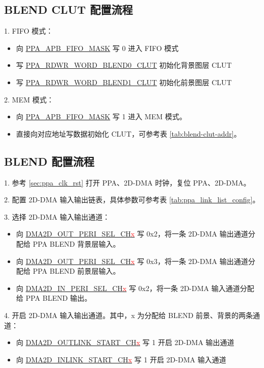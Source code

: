 \documentclass[main\_\_CN.tex]{subfiles}
\begin{document}
\subsection{BLEND CLUT 配置流程}
\label{sec: ppa_blend_clut_config}
1. FIFO 模式：

\begin{itemize}
    \item 向 \hyperref[fielddesc:PPAAPBFIFOMASK]{PPA\_APB\_FIFO\_MASK} 写 0 进入 FIFO 模式
    \item 写 \hyperref[fielddesc:PPARDWRWORDBLEND0CLUT]{PPA\_RDWR\_WORD\_BLEND0\_CLUT} 初始化背景图层 CLUT
    \item 写 \hyperref[fielddesc:PPARDWRWORDBLEND1CLUT]{PPA\_RDWR\_WORD\_BLEND1\_CLUT} 初始化前景图层 CLUT
\end{itemize}
2. MEM 模式：

\begin{itemize}
    \item 向 \hyperref[fielddesc:PPAAPBFIFOMASK]{PPA\_APB\_FIFO\_MASK} 写 1 进入 MEM 模式。
    \item 直接向对应地址写数据初始化 CLUT，可参考表 \ref{tab:blend-clut-addr}。
\end{itemize}

\subsection{BLEND 配置流程}
1. 参考 \ref{sec:ppa_clk_rst} 打开 PPA、2D-DMA 时钟，复位 PPA、2D-DMA。

2. 配置 2D-DMA 输入输出链表，具体参数可参考表 \ref{tab:ppa_link_list_config}。

3. 选择 2D-DMA 输入输出通道：
\begin{itemize}
    \item 向 \hyperref[fielddesc:DMA2DOUTPERISELCHN]{DMA2D\_OUT\_PERI\_SEL\_CH\textcolor{red}{x}} 写 0x2，将一条 2D-DMA 输出通道分配给 PPA BLEND 背景层输入。
    \item 向 \hyperref[fielddesc:DMA2DOUTPERISELCHN]{DMA2D\_OUT\_PERI\_SEL\_CH\textcolor{red}{x}} 写 0x3，将一条 2D-DMA 输出通道分配给 PPA BLEND 前景层输入。
    \item 向 \hyperref[fielddesc:DMA2DINPERISELCHN]{DMA2D\_IN\_PERI\_SEL\_CH\textcolor{red}{x}} 写 0x2，将一条 2D-DMA 输入通道分配给 PPA BLEND 输出。
\end{itemize}

4. 开启 2D-DMA 输入输出通道。其中，x 为分配给 BLEND 前景、背景的两条通道：
\begin{itemize}
    \item 向 \hyperref[fielddesc:DMA2DOUTLINKSTARTCHN]{DMA2D\_OUTLINK\_START\_CH\textcolor{red}{x}} 写 1 开启 2D-DMA 输出通道
    \item 向 \hyperref[fielddesc:DMA2DINLINKSTARTCHN]{DMA2D\_INLINK\_START\_CH\textcolor{red}{x}} 写 1 开启 2D-DMA 输入通道
\end{itemize}
\end{document}
